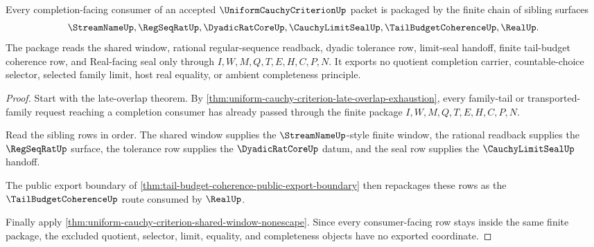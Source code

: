 \begin{theorem}
\label{thm:uniform-cauchy-criterion-completion-consumer-package}
Every completion-facing consumer of an accepted $\UniformCauchyCriterionUp$ packet is packaged by the finite chain of sibling surfaces
$$
\StreamNameUp,\RegSeqRatUp,\DyadicRatCoreUp,\CauchyLimitSealUp,\TailBudgetCoherenceUp,\RealUp .
$$
The package reads the shared window, rational regular-sequence readback, dyadic tolerance row, limit-seal handoff, finite tail-budget coherence row, and Real-facing seal only through $I,W,M,Q,T,E,H,C,P,N$. It exports no quotient completion carrier, countable-choice selector, selected family limit, host real equality, or ambient completeness principle.
\end{theorem}
\begin{proof}
Start with the late-overlap theorem. By \autoref{thm:uniform-cauchy-criterion-late-overlap-exhaustion}, every family-tail or transported-family request reaching a completion consumer has already passed through the finite package $I,W,M,Q,T,E,H,C,P,N$.

Read the sibling rows in order. The shared window supplies the $\StreamNameUp$-style finite window, the rational readback supplies the $\RegSeqRatUp$ surface, the tolerance row supplies the $\DyadicRatCoreUp$ datum, and the seal row supplies the $\CauchyLimitSealUp$ handoff.

The public export boundary of \autoref{thm:tail-budget-coherence-public-export-boundary} then repackages these rows as the $\TailBudgetCoherenceUp$ route consumed by $\RealUp$.

Finally apply \autoref{thm:uniform-cauchy-criterion-shared-window-nonescape}. Since every consumer-facing row stays inside the same finite package, the excluded quotient, selector, limit, equality, and completeness objects have no exported coordinate.
\end{proof}

